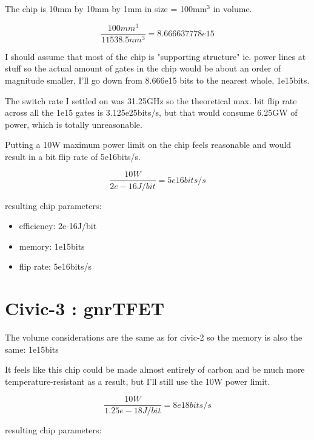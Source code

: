 \documentclass[a4paper]{article}
\begin{document}
	The chip is 10mm by 10mm by 1mm in size = 100mm$^3$ in volume.
	
	$$ \frac{100mm^3}{11538.5nm^3} = 8.666637778e15 $$
	
	I should assume that most of the chip is "supporting structure" ie. power lines at stuff so the actual amount of gates in the chip would be about an order of magnitude smaller, I'll go down from 8.666e15 bits to the nearest whole, 1e15bits.
	
	\medskip
	
	The switch rate I settled on was 31.25GHz so the theoretical max. bit flip rate across all the 1e15 gates is 3.125e25bits/s, but that would consume 6.25GW of power, which is totally unreasonable.
	
	\medskip
	
	Putting a 10W maximum power limit on the chip feels reasonable and would result in a bit flip rate of 5e16bits/s.
	
	$$ \frac{10W}{2e-16J/bit} = 5e16bits/s $$
	
	resulting chip parameters:
	
	\begin{itemize}
		\item efficiency: 2e-16J/bit
		
		\item memory: 1e15bits
		
		\item flip rate: 5e16bits/s
	\end{itemize}
	
	\section{Civic-3 : gnrTFET}
	
	The volume considerations are the same as for civic-2 so the memory is also the same: 1e15bits
	
	\medskip
	
	It feels like this chip could be made almost entirely of carbon and be much more temperature-resistant as a result, but I'll still use the 10W power limit.
	
	$$ \frac{10W}{1.25e-18J/bit} = 8e18bits/s$$
	
	resulting chip parameters:
	
\end{document}
